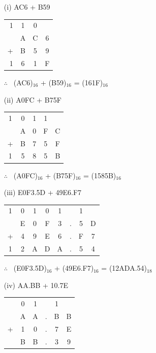 \begin{solution}
\begin{itemize}
\item[(i)] AC6 + B59

\begin{tabular}{rccc}
{\footnotesize 1} & {\footnotesize 1} & {\footnotesize 0} &\\
 & A & C & 6\\
+ & B & 5 & 9\\
\hline
1 & 6 & 1 & F
\end{tabular}

\medskip
$\therefore$~ (AC6)$_{16}$ + (B59)$_{16}$ = (161F)$_{16}$

\item[(ii)] A0FC + B75F

\begin{tabular}{ccccc}
{\footnotesize 1} & {\footnotesize 0} & {\footnotesize 1} & {\footnotesize 1} & \\
 & A & 0 & F & C \\
+ & B & 7 & 5 & F\\
\hline
1 & 5 & 8 & 5 & B
\end{tabular}

\medskip
$\therefore$~ (A0FC)$_{16}$ + (B75F)$_{16}$ = (1585B)$_{16}$

\item[(iii)] E0F3.5D + 49E6.F7

\begin{tabular}{cccccccc}
{\footnotesize 1} & {\footnotesize 0} & {\footnotesize 1} & {\footnotesize 0} & {\footnotesize 1} & & {\footnotesize 1} &\\
 & E & 0 & F & 3 & . & 5 & D\\
+ & 4 & 9 & E & 6 & . & F & 7\\
\hline
1 & 2 & A & D & A & . & 5 & 4
\end{tabular}

\medskip
$\therefore$~ (E0F3.5D)$_{16}$ + (49E6.F7)$_{16}$ = (12ADA.54)$_{18}$

\item[(iv)] AA.BB + 10.7E

\begin{tabular}{cccccc}
 & {\footnotesize 0} & {\footnotesize 1} & & {\footnotesize 1} &\\
 & A & A & . & B & B\\
+ & 1 & 0 & . & 7 & E\\
\cline{2-5}
 & B & B & . & 3 & 9
\end{tabular}


\end{itemize}
\end{solution}
